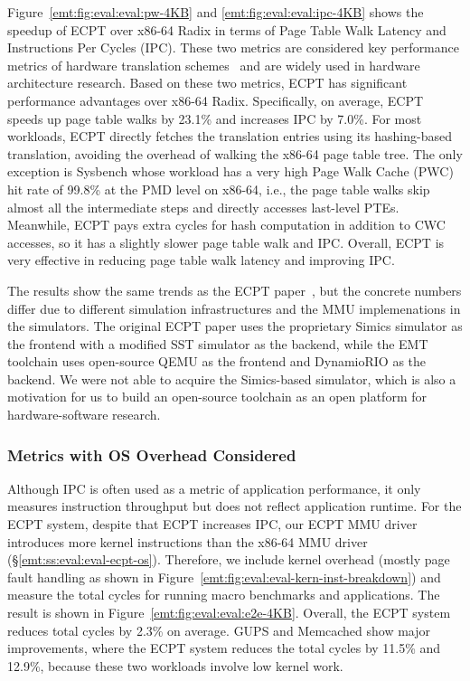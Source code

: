 \noindent
Figure~\ref{emt:fig:eval:eval:pw-4KB} and \ref{emt:fig:eval:eval:ipc-4KB}
	shows the speedup of ECPT over x86-64 Radix in terms of 
    Page Table Walk Latency and Instructions Per Cycles (IPC).
These two metrics are considered key performance metrics of hardware translation schemes~\cite{skarlatos2020ecpt,park2022fpt}
    and are widely used in hardware architecture research.
Based on these two metrics, ECPT has significant performance advantages over x86-64 Radix.
Specifically, on average, ECPT speeds up page table walks by 23.1\%
	and increases IPC by 7.0\%.
For most workloads, ECPT directly fetches the translation entries using its hashing-based translation,
    avoiding the overhead of walking the x86-64 page table tree.
The only exception is Sysbench whose workload has a very high Page Walk Cache (PWC) hit rate of 99.8\%
    at the PMD level on x86-64, i.e., 
	the page table walks skip almost all the intermediate steps and directly accesses last-level PTEs.
Meanwhile, ECPT pays extra cycles for hash computation in addition to CWC accesses,
    so it has a slightly slower page table walk and IPC.
Overall, ECPT is very effective in reducing page table walk latency and improving IPC.

The results show the same trends as the ECPT paper~\cite{skarlatos2020ecpt},
    but the concrete numbers differ due to different simulation infrastructures
    and the MMU implemenations in the simulators.
The original ECPT paper uses the proprietary Simics simulator as the frontend with a modified
    SST simulator as the backend, while the EMT toolchain uses open-source QEMU as the frontend 
    and DynamioRIO as the backend.
We were not able to acquire the Simics-based simulator, which is also a motivation 
    for us to build an open-source toolchain as an open platform for 
    hardware-software research.

\subsubsection{Metrics with OS Overhead Considered}

\noindent
Although IPC is often used as a metric of application performance,
    it only measures instruction throughput but does not reflect application runtime.
For the ECPT system, despite that
	ECPT increases IPC, 
    our ECPT MMU driver introduces more kernel instructions than the x86-64 MMU driver (\S\ref{emt:ss:eval:eval-ecpt-os}).
Therefore, we include kernel overhead (mostly page fault handling as shown in Figure~\ref{emt:fig:eval:eval-kern-inst-breakdown}) 
	and measure the total cycles for running 
	macro benchmarks and applications.
The result is shown in Figure~\ref{emt:fig:eval:eval:e2e-4KB}.
Overall, the ECPT system reduces total cycles by 2.3\% on average.
GUPS and Memcached show major improvements, where the ECPT system reduces the total cycles 
	by 11.5\% and 12.9\%, because these two workloads involve low kernel work.


